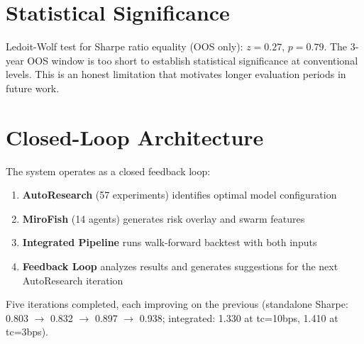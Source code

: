 \documentclass[12pt]{article}
\begin{document}
\section{Statistical Significance}
Ledoit-Wolf test for Sharpe ratio equality (OOS only): $z = 0.27$, $p = 0.79$. The 3-year OOS window is too short to establish statistical significance at conventional levels. This is an honest limitation that motivates longer evaluation periods in future work.

\section{Closed-Loop Architecture}
The system operates as a closed feedback loop:
\begin{enumerate}
\item \textbf{AutoResearch} (57 experiments) identifies optimal model configuration
\item \textbf{MiroFish} (14 agents) generates risk overlay and swarm features
\item \textbf{Integrated Pipeline} runs walk-forward backtest with both inputs
\item \textbf{Feedback Loop} analyzes results and generates suggestions for the next AutoResearch iteration
\end{enumerate}
Five iterations completed, each improving on the previous (standalone Sharpe: 0.803 $\to$ 0.832 $\to$ 0.897 $\to$ 0.938; integrated: 1.330 at tc=10bps, 1.410 at tc=3bps).
\end{document}
